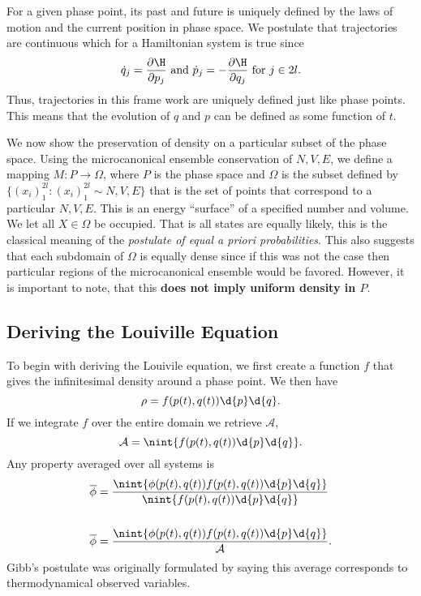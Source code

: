 For a given phase point, its past and future is uniquely defined by the laws of
motion and the current position in phase space. We postulate that trajectories
are continuous which for a Hamiltonian system is true since
\begin{equation*}
	\dot{q}_{j} = \frac{\partial\H}{\partial p_{j}} \text{ and } \dot{p}_{j} = -
	\frac{\partial\H}{\partial q_{j}} \text{ for } j \in 2l.
\end{equation*}
Thus, trajectories in this frame work are uniquely defined just like phase
points. This means that the evolution of $q$ and $p$ can be defined as some
function of $t$.

We now show the preservation of density on a particular subset of the phase
space. Using the microcanonical ensemble conservation of $N, V, E$, we define a
mapping $M:P\to\Omega$, where $P$ is the phase space and $\Omega$ is the subset
defined by $\{(x_{i})_{1}^{2l} : (x_{i})_{1}^{2l} \sim N, V, E\}$ that is the set
of points that correspond to a particular $N,V,E$. This is an energy ``surface''
of a specified number and volume. We let all $X\in\Omega$ be occupied.  That is
all states are equally likely, this is the classical meaning of the
\textit{postulate of equal a priori probabilities}. This also suggests that
each subdomain of $\Omega$ is equally dense since if this was not the case then
particular regions of the microcanonical ensemble would be favored. However, it
is important to note, that this \textbf{does not imply uniform density in $P$}.

\subsection{Deriving the Louiville Equation}
To begin with deriving the Louivile equation, we first create a function $f$
that gives the infinitesimal density around a phase point. We then have
\begin{equation*}
	\rho = f(p(t), q(t))\d{p}\d{q}.
\end{equation*}
If we integrate $f$ over the entire domain we retrieve $\mathcal{A}$,
\begin{equation*}
	\mathcal{A} = \nint{f(p(t),q(t))\d{p}\d{q}}.
\end{equation*}
Any property averaged over all systems is
\begin{align*}
	\overline{\phi} &= \frac{\nint{\phi(p(t),q(t))f(p(t),q(t))\d{p}\d{q}}}
	{\nint{f(p(t),q(t))\d{p}\d{q}}}\\
	~\\
	\overline{\phi} &= \frac{\nint{\phi(p(t),q(t))f(p(t),q(t))\d{p}\d{q}}}
	{\mathcal{A}}.
\end{align*}
Gibb's postulate was originally formulated by saying this average corresponds to
thermodynamical observed variables.


